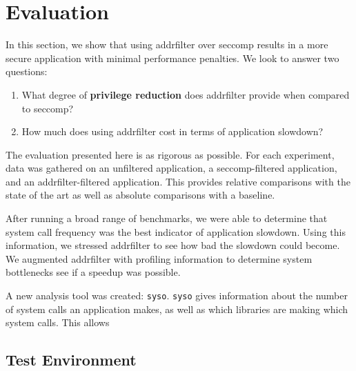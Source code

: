 \section{Evaluation}

In this section, we show that using addrfilter over seccomp
results in a more secure application with minimal performance penalties. We
look to answer two questions:

\begin{enumerate}
    \item What degree of \textbf{privilege reduction} does addrfilter
        provide when compared to seccomp?
    \item How much does using addrfilter cost in terms of application
        slowdown?
\end{enumerate}

The evaluation presented here is as rigorous as possible. For each
experiment, data was gathered on an unfiltered application, a seccomp-filtered 
application, and an addrfilter-filtered application. This provides relative 
comparisons with the state of the art as well as absolute comparisons with a
baseline. %

After running a broad range of benchmarks, we were able to determine that 
system call frequency was the best indicator of application slowdown. Using 
this information, we stressed addrfilter to see how bad the slowdown could
become. We augmented addrfilter with profiling information to determine system
bottlenecks see if a speedup was possible.

A new analysis tool was created: \texttt{syso}. \texttt{syso} gives information
about the number of system calls an application makes, as well as which
libraries are making which system calls. This allows 

\subsection{Test Environment}
